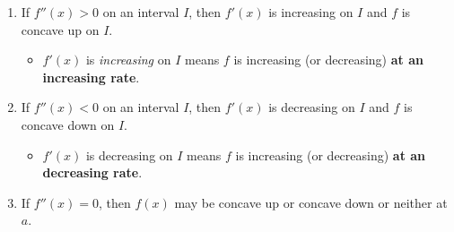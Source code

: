 \begin{tcolorbox}[title = {The Second Derivative Condition for Concavity}]
\renewcommand{\labelenumi}{(\alph{enumi})}
\begin{enumerate}[leftmargin=*]
    \item If $f''(x)>0$ on an interval $I$, then $f'(x)$ is increasing on $I$ and $f$ is concave up on $I$.
    \begin{itemize}[leftmargin=*]
        \item $f'(x)$ is \emph{increasing} on $I$ means $f$ is increasing (or decreasing) \textbf{at an increasing rate}.
    \end{itemize}
    \item If $f''(x)<0$ on an interval $I$, then $f'(x)$ is decreasing on $I$ and $f$ is concave down on $I$.
    \begin{itemize}[leftmargin=*]
        \item $f'(x)$ is decreasing on $I$ means $f$ is increasing (or decreasing) \textbf{at an decreasing rate}.
    \end{itemize}
    \item If $f''(x)=0$, then $f(x)$ may be concave up or concave down or neither at $a$.
\end{enumerate}
\end{tcolorbox}


